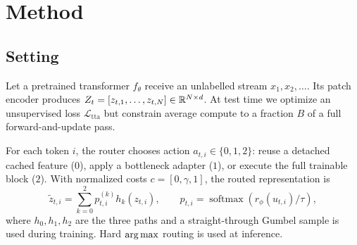 \section{Method}
\label{sec:method}

\subsection{Setting}

Let a pretrained transformer $f_{\theta}$ receive an unlabelled stream
$x_1,x_2,\ldots$.  Its patch encoder produces
$Z_t=[z_{t,1},\ldots,z_{t,N}]\in\mathbb{R}^{N\times d}$.  At test time we optimize an
unsupervised loss $\mathcal{L}_{\mathrm{tta}}$ but constrain average compute to
a fraction $B$ of a full forward-and-update pass.

For each token $i$, the router chooses action
$a_{t,i}\in\{0,1,2\}$: reuse a detached cached feature ($0$), apply a bottleneck
adapter ($1$), or execute the full trainable block ($2$).  With normalized costs
$c=[0,\gamma,1]$, the routed representation is
\begin{equation}
 \tilde z_{t,i}=\sum_{k=0}^{2}p_{t,i}^{(k)}h_k(z_{t,i}), \qquad
 p_{t,i}=\operatorname{softmax}\!\left(r_{\phi}(u_{t,i})/\tau\right),
 \label{eq:routing}
\end{equation}
where $h_0,h_1,h_2$ are the three paths and a straight-through Gumbel sample is
used during training.  Hard $\operatorname*{arg\,max}$ routing is used at inference.

